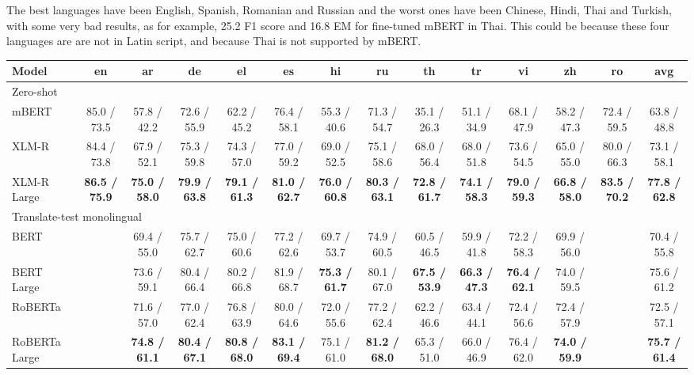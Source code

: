 \documentclass[11pt]{article}
\begin{document}
The best languages have been English, Spanish, Romanian and Russian and the worst ones have been Chinese, Hindi, Thai and Turkish, with some very bad results, as for example, 25.2 F1 score and 16.8 EM for fine-tuned mBERT in Thai. This could be because these four languages are are not in Latin script, and because Thai is not supported by mBERT.

\begin{table*}[!ht]
    \centering
    \begin{adjustbox}{max width=\textwidth}
    \begin{tabular}{l|cccccccccccc|c}
        \toprule
        Model & en & ar & de & el & es & hi & ru & th & tr & vi & zh & ro & avg \\
        \midrule
        \multicolumn{14}{l}{Zero-shot} \\
        \midrule
        mBERT & 85.0 / 73.5 & 57.8 / 42.2 & 72.6 / 55.9 & 62.2 / 45.2 & 76.4 / 58.1 & 55.3 / 40.6 & 71.3 / 54.7 & 35.1 / 26.3 & 51.1 / 34.9 & 68.1 / 47.9 & 58.2 / 47.3 & 72.4 / 59.5 & 63.8 / 48.8 \\
        XLM-R & 84.4 / 73.8 & 67.9 / 52.1 & 75.3 / 59.8 & 74.3 / 57.0 & 77.0 / 59.2 & 69.0 / 52.5 & 75.1 / 58.6 & 68.0 / 56.4 & 68.0 / 51.8 & 73.6 / 54.5 & 65.0 / 55.0 & 80.0 / 66.3 & 73.1 / 58.1 \\
        XLM-R Large &\textbf{86.5 / 75.9}&\textbf{75.0 / 58.0}&\textbf{79.9 / 63.8}&\textbf{79.1 / 61.3}&\textbf{81.0 / 62.7}&\textbf{76.0 / 60.8}&\textbf{80.3 / 63.1}&\textbf{72.8 / 61.7}&\textbf{74.1 / 58.3}&\textbf{79.0 / 59.3}&\textbf{66.8 / 58.0}&\textbf{83.5 / 70.2}&\textbf{77.8 / 62.8}\\
        \midrule
        \multicolumn{14}{l}{Translate-test monolingual} \\
        \midrule
        BERT & ~ & 69.4 / 55.0 & 75.7 / 62.7 & 75.0 / 60.6 & 77.2 / 62.6 & 69.7 / 53.7 & 74.9 / 60.5 & 60.5 / 46.5 & 59.9 / 41.8 & 72.2 / 58.3 & 69.9 / 56.0 & ~ & 70.4 / 55.8 \\
        BERT Large & ~ & 73.6 / 59.1 & 80.4 / 66.4 & 80.2 / 66.8 & 81.9 / 68.7 &\textbf{75.3 / 61.7}& 80.1 / 67.0 &\textbf{67.5 / 53.9}&\textbf{66.3 / 47.3}&\textbf{76.4 / 62.1}& 74.0 / 59.5 & ~ & 75.6 / 61.2 \\
        RoBERTa & ~ & 71.6 / 57.0 & 77.0 / 62.4 & 76.8 / 63.9 & 80.0 / 64.6 & 72.0 / 55.6 & 77.2 / 62.4 & 62.2 / 46.6 & 63.4 / 44.1 & 72.4 / 56.6 & 72.4 / 57.9 & ~ & 72.5 / 57.1 \\
        RoBERTa Large & ~ &\textbf{74.8 / 61.1}&\textbf{80.4 / 67.1}&\textbf{80.8 / 68.0}&\textbf{83.1 / 69.4}& 75.1 / 61.0 &\textbf{81.2 / 68.0}& 65.3 / 51.0 & 66.0 / 46.9 & 76.4 / 62.0 &\textbf{74.0 / 59.9}& ~ &\textbf{75.7 / 61.4}\\

\end{tabular}
\end{adjustbox}
\end{table*}
\end{document}
